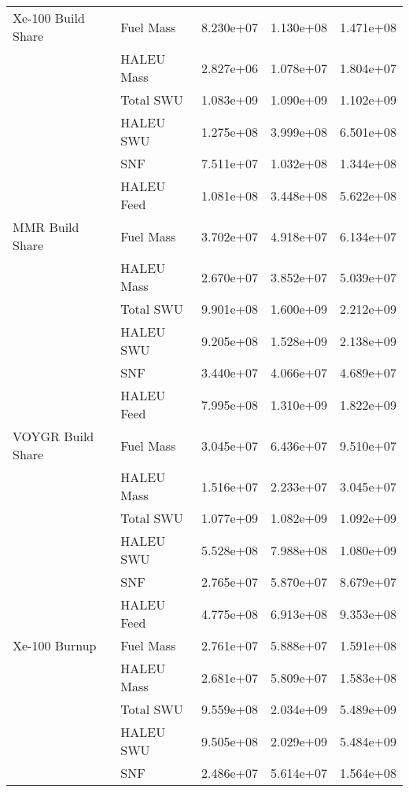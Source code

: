\begin{table}[ht!]
\begin{tabular}{llrrr}
        Xe-100 Build Share &  Fuel Mass & 8.230e+07 & 1.130e+08 & 1.471e+08 \\
                           & HALEU Mass & 2.827e+06 & 1.078e+07 & 1.804e+07 \\
                           &  Total SWU & 1.083e+09 & 1.090e+09 & 1.102e+09 \\
                           &  HALEU SWU & 1.275e+08 & 3.999e+08 & 6.501e+08 \\
                           &        SNF & 7.511e+07 & 1.032e+08 & 1.344e+08 \\
                           & HALEU Feed & 1.081e+08 & 3.448e+08 & 5.622e+08 \\\hline 
        MMR Build Share &  Fuel Mass & 3.702e+07 & 4.918e+07 & 6.134e+07 \\
                        & HALEU Mass & 2.670e+07 & 3.852e+07 & 5.039e+07 \\
                        &  Total SWU & 9.901e+08 & 1.600e+09 & 2.212e+09 \\
                        &  HALEU SWU & 9.205e+08 & 1.528e+09 & 2.138e+09 \\
                        &        SNF & 3.440e+07 & 4.066e+07 & 4.689e+07 \\
                        & HALEU Feed & 7.995e+08 & 1.310e+09 & 1.822e+09 \\\hline 
        VOYGR Build Share &  Fuel Mass & 3.045e+07 & 6.436e+07 & 9.510e+07 \\
                          & HALEU Mass & 1.516e+07 & 2.233e+07 & 3.045e+07 \\
                          &  Total SWU & 1.077e+09 & 1.082e+09 & 1.092e+09 \\
                          &  HALEU SWU & 5.528e+08 & 7.988e+08 & 1.080e+09 \\
                          &        SNF & 2.765e+07 & 5.870e+07 & 8.679e+07 \\
                          & HALEU Feed & 4.775e+08 & 6.913e+08 & 9.353e+08 \\\hline 
        Xe-100 Burnup &  Fuel Mass & 2.761e+07 & 5.888e+07 & 1.591e+08 \\
                      & HALEU Mass & 2.681e+07 & 5.809e+07 & 1.583e+08 \\
                      &  Total SWU & 9.559e+08 & 2.034e+09 & 5.489e+09 \\
                      &  HALEU SWU & 9.505e+08 & 2.029e+09 & 5.484e+09 \\
                      &        SNF & 2.486e+07 & 5.614e+07 & 1.564e+08 \\

\end{tabular}
\end{table}
